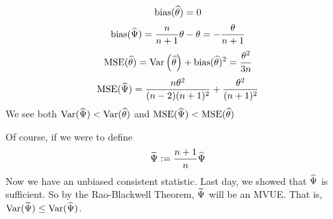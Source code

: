 $$\bias*{\that} = 0$$
$$\bias*{\Psihat} = \frac{n}{n+1} \theta - \theta = -\frac{\theta}{n+1}$$%
$$\MSE*{\that} = \Var{\that} + \bias*{\that}^2 = \frac{\theta^2}{3n}$$
$$\MSE*{\Psihat} = \frac{n\theta^2}{(n-2)(n+1)^2} + \frac{\theta^2}{(n+1)^2}$$
We see both $\Var*{\Psihat} < \Var*{\that}$ and $\MSE*{\Psihat} < \MSE*{\that}$

\nl Of course, if we were to define
$$\widetilde{\Psi} := \frac{n+1}{n}\widehat{\Psi}$$
Now we have an unbiased consistent statistic. Last day, we showed that $\widehat{\Psi}$ is sufficient. So by the Rao-Blackwell Theorem, $\widetilde{\Psi}$ will be an MVUE. That is, $\Var*{\Psitil} \leq \Var*{\Psihat}$.
